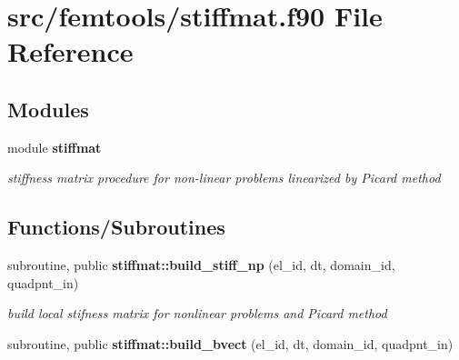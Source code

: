 \section{src/femtools/stiffmat.f90 File Reference}
\label{stiffmat_8f90}
\subsection*{Modules}
\begin{DoxyCompactItemize}
\item 
module {\bf stiffmat}
\begin{DoxyCompactList}\small\item\em stiffness matrix procedure for non-\/linear problems linearized by Picard method \end{DoxyCompactList}\end{DoxyCompactItemize}
\subsection*{Functions/\+Subroutines}
\begin{DoxyCompactItemize}
\item 
subroutine, public {\bf stiffmat\+::build\+\_\+stiff\+\_\+np} (el\+\_\+id, dt, domain\+\_\+id, quadpnt\+\_\+in)
\begin{DoxyCompactList}\small\item\em build local stifness matrix for nonlinear problems and Picard method \end{DoxyCompactList}\item 
subroutine, public {\bf stiffmat\+::build\+\_\+bvect} (el\+\_\+id, dt, domain\+\_\+id, quadpnt\+\_\+in)
\end{DoxyCompactItemize}
